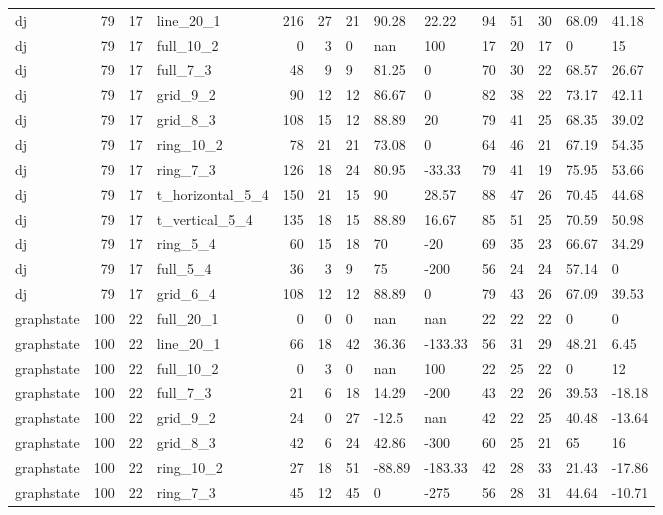 \begin{longtable}{lrrlrrlllrrlll}
dj & 79 & 17 & line\_20\_1 & 216 & 27 & 21 & 90.28 & 22.22 & 94 & 51 & 30 & 68.09 & 41.18 \\
dj & 79 & 17 & full\_10\_2 & 0 & 3 & 0 & nan & 100 & 17 & 20 & 17 & 0 & 15 \\
dj & 79 & 17 & full\_7\_3 & 48 & 9 & 9 & 81.25 & 0 & 70 & 30 & 22 & 68.57 & 26.67 \\
dj & 79 & 17 & grid\_9\_2 & 90 & 12 & 12 & 86.67 & 0 & 82 & 38 & 22 & 73.17 & 42.11 \\
dj & 79 & 17 & grid\_8\_3 & 108 & 15 & 12 & 88.89 & 20 & 79 & 41 & 25 & 68.35 & 39.02 \\
dj & 79 & 17 & ring\_10\_2 & 78 & 21 & 21 & 73.08 & 0 & 64 & 46 & 21 & 67.19 & 54.35 \\
dj & 79 & 17 & ring\_7\_3 & 126 & 18 & 24 & 80.95 & -33.33 & 79 & 41 & 19 & 75.95 & 53.66 \\
dj & 79 & 17 & t\_horizontal\_5\_4 & 150 & 21 & 15 & 90 & 28.57 & 88 & 47 & 26 & 70.45 & 44.68 \\
dj & 79 & 17 & t\_vertical\_5\_4 & 135 & 18 & 15 & 88.89 & 16.67 & 85 & 51 & 25 & 70.59 & 50.98 \\
dj & 79 & 17 & ring\_5\_4 & 60 & 15 & 18 & 70 & -20 & 69 & 35 & 23 & 66.67 & 34.29 \\
dj & 79 & 17 & full\_5\_4 & 36 & 3 & 9 & 75 & -200 & 56 & 24 & 24 & 57.14 & 0 \\
dj & 79 & 17 & grid\_6\_4 & 108 & 12 & 12 & 88.89 & 0 & 79 & 43 & 26 & 67.09 & 39.53 \\
graphstate & 100 & 22 & full\_20\_1 & 0 & 0 & 0 & nan & nan & 22 & 22 & 22 & 0 & 0 \\
graphstate & 100 & 22 & line\_20\_1 & 66 & 18 & 42 & 36.36 & -133.33 & 56 & 31 & 29 & 48.21 & 6.45 \\
graphstate & 100 & 22 & full\_10\_2 & 0 & 3 & 0 & nan & 100 & 22 & 25 & 22 & 0 & 12 \\
graphstate & 100 & 22 & full\_7\_3 & 21 & 6 & 18 & 14.29 & -200 & 43 & 22 & 26 & 39.53 & -18.18 \\
graphstate & 100 & 22 & grid\_9\_2 & 24 & 0 & 27 & -12.5 & nan & 42 & 22 & 25 & 40.48 & -13.64 \\
graphstate & 100 & 22 & grid\_8\_3 & 42 & 6 & 24 & 42.86 & -300 & 60 & 25 & 21 & 65 & 16 \\
graphstate & 100 & 22 & ring\_10\_2 & 27 & 18 & 51 & -88.89 & -183.33 & 42 & 28 & 33 & 21.43 & -17.86 \\
graphstate & 100 & 22 & ring\_7\_3 & 45 & 12 & 45 & 0 & -275 & 56 & 28 & 31 & 44.64 & -10.71 \\

\end{longtable}
